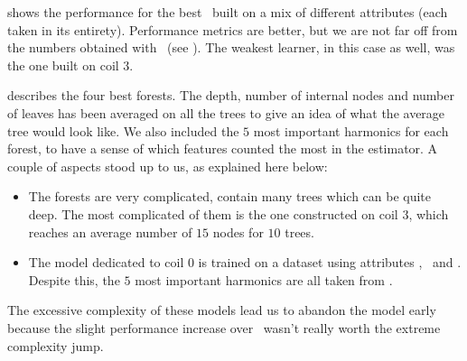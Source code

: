  shows the performance for the best \rfs\ built on a mix of different attributes
(each taken in its entirety). Performance metrics are better, but we are not far off from the
numbers obtained with \dts\ (see ). The weakest learner, in this case as well, was the one built on coil $3$.

 describes the four best forests. The depth, number of internal nodes and number of leaves has been
averaged on all the trees to give an idea of what the average tree would look like. We also included
the $5$ most important harmonics for each forest, to have a sense of which features counted the
most in the estimator. A couple of aspects stood up to us, as explained here below:
\begin{itemize}
	\item The forests are very complicated, contain many trees which can be quite deep. The
		most complicated of them is the one constructed on coil $3$, which reaches an
		average number of $15$ nodes for $10$ trees.
	\item The model dedicated to coil $0$ is trained on a dataset using attributes \an, \cnmod\ and
		\phin. Despite this, the $5$ most important harmonics are all taken from \an.
\end{itemize}
The excessive complexity of these models lead us to abandon the model early because the slight
performance increase over \dts\ wasn't really worth the extreme complexity jump.
